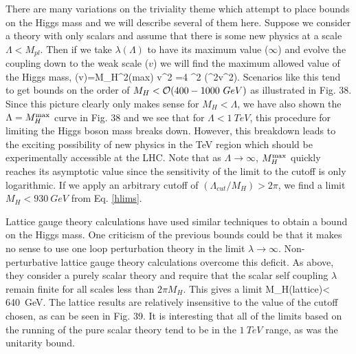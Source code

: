 There are many variations on the
triviality theme which attempt to place
bounds on the Higgs mass and we will describe several of them here.
Suppose we consider a theory with only scalars and assume that
there is some new physics at a scale $\Lambda < M_{pl}$.
Then
if we take $\lambda(\Lambda)$ to have its maximum value ($\infty$)
and evolve the coupling down to the weak scale ($v$) we will find
the maximum  allowed value of the Higgs mass,
\beq
\lambda(v)={M_H^2({\rm max}) v^2}
={4 \pi^2  \log({\Lambda^2\over v^2})}.
\label{hlims}
\eeq
Scenarios like this tend to get bounds on the order of $M_H<
{\cal O}(400-1000~GeV)$ as illustrated in Fig. 38.
Since this picture clearly only makes sense for $M_H<\Lambda$,
we have also shown the $\Lambda=M_H^{\rm max}$ curve in
Fig. 38 and we see that for $\Lambda < 1~TeV$, this procedure
for limiting the Higgs boson mass breaks down.  However,
this breakdown leads to the exciting possibility of new
physics in the TeV region  which should be experimentally accessible
at the LHC.
Note that as $\Lambda\rightarrow \infty$,
$M_H^{\rm max}$  quickly reaches its asymptotic value since
the sensitivity of the limit to the cutoff is only logarithmic.
If we apply an arbitrary
cutoff
 of $(\Lambda_{cut}/M_H)> 2 \pi$, we find a limit $M_H < 930~GeV$
from Eq. \ref{hlims}.


Lattice gauge theory calculations have used
similar techniques to obtain
a bound on the Higgs mass.\cite{latbounds}
 One criticism of the previous bounds could
be that it makes no sense to use one loop perturbation theory in
the limit $\lambda\rightarrow \infty$.  Non-perturbative lattice gauge
theory calculations overcome this deficit.  As above, they consider
a purely scalar theory and require that the scalar self coupling
$\lambda$ remain finite for all scales less than $2 \pi M_H$.
This gives a limit\cite{hasen}
\beq
M_H({\rm lattice})< 640~GeV.
\eeq
 The lattice results are relatively
insensitive to the value of the cutoff chosen, as can be seen in Fig.
39.
It is interesting that all of the limits based on the running of the
pure scalar theory tend to be in the $1~TeV$  range, as was the unitarity
bound.


